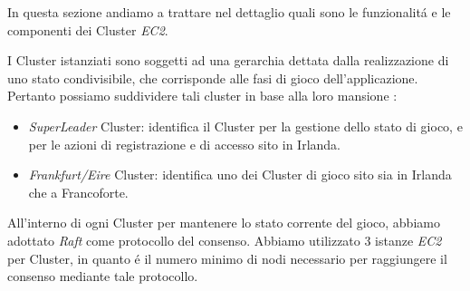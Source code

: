 \documentclass{sig-alternate-05-2015}
\begin{document}
In questa sezione andiamo a trattare nel dettaglio quali sono le funzionalit\'a e le componenti dei Cluster \textit{EC2}.

I Cluster istanziati sono soggetti ad una gerarchia dettata dalla realizzazione di uno stato condivisibile, che corrisponde alle fasi di gioco dell'applicazione.
Pertanto possiamo suddividere tali cluster in base alla loro mansione :
\begin{itemize}
\item \textit{SuperLeader} Cluster: identifica il Cluster per la gestione dello stato di gioco, e per le azioni di registrazione e di accesso sito in Irlanda.
\item \textit{Frankfurt/Eire} Cluster: identifica uno dei Cluster di gioco sito sia in Irlanda che a Francoforte.
\end{itemize}
All'interno di ogni Cluster per mantenere lo stato corrente del gioco, abbiamo adottato \textit{Raft} come protocollo del consenso. Abbiamo utilizzato 3 istanze \textit{EC2} per Cluster, in quanto \'e il numero minimo di nodi necessario per raggiungere il consenso mediante tale protocollo.

\begin{comment}

\subsubsection{Superleader Cluster}

Tale Cluster si occupa della elaborazione dello stato corrente di gioco, e della notifica  del cambiamento di stato verso gli altri Cluster mediante il servizio SNS. 
Sfrutta il servizio offerto da DynamoDB per memorizzare i dati di registrazione dell'utente.


\subsubsection{Frankfurt/Eire Cluster}


Entrambi i Cluster svolgono le medesime attivit\'a, in quanto ricevono entrambi gli aggiornamenti dello stato attraverso il servizio di SNS.
Raccolgono le azioni di gioco prodotte dagli utenti durante le fasi di gioco, salvandole momentaneamente all'interno dell'apposita cache, la quale sfrutta il servizio Redis. 
Contattano il servizio DynamoDB per ottenere sempre i dati aggiornati dei vari giocatori, successivamente notificano al SuperLeader Cluster il completamento dell'esecuzione della fase.

\end{comment}
\end{document}
